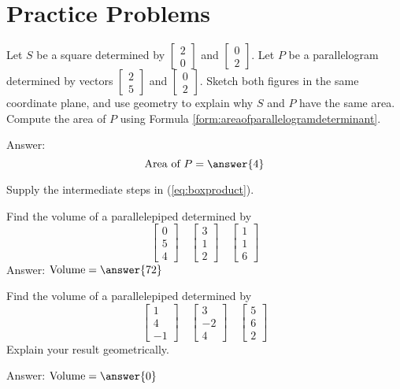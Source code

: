 \documentclass{ximera}
\begin{document}
\section*{Practice Problems}

\begin{problem} Let $S$ be a square determined by $\begin{bmatrix}2\\0\end{bmatrix}$ and $\begin{bmatrix}0\\2\end{bmatrix}$.  Let $P$ be a parallelogram determined by vectors $\begin{bmatrix}2\\5\end{bmatrix}$ and $\begin{bmatrix}0\\2\end{bmatrix}$.  Sketch both figures in the same coordinate plane, and use geometry to explain why $S$ and $P$ have the same area.  Compute the area of $P$ using Formula \ref{form:areaofparallelogramdeterminant}.

Answer: $$\text{Area of }P=\answer{4}$$
\end{problem}

\begin{problem}
Supply the intermediate steps in (\ref{eq:boxproduct}).
\end{problem}

\begin{problem}
Find the volume of a parallelepiped determined by 
$$\begin{bmatrix}0\\5\\4\end{bmatrix}\quad\begin{bmatrix}3\\1\\2\end{bmatrix}\quad\begin{bmatrix}1\\1\\6\end{bmatrix}$$
Answer: $\mbox{Volume}=\answer{72}$
\end{problem}

\begin{problem}
Find the volume of a parallelepiped determined by 
$$\begin{bmatrix}1\\4\\-1\end{bmatrix}\quad\begin{bmatrix}3\\-2\\4\end{bmatrix}\quad\begin{bmatrix}5\\6\\2\end{bmatrix}$$
Explain your result geometrically.

Answer: $\mbox{Volume}=\answer{0}$
\end{problem}
\end{document}
